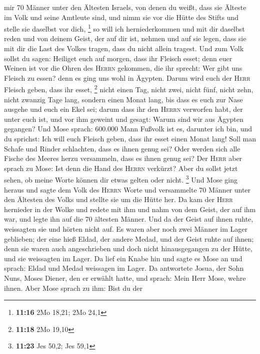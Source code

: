 mir 70 Männer unter den Ältesten Israels, von denen du weißt, dass sie
Älteste im Volk und seine Amtleute sind, und nimm sie vor die Hütte des
Stifts und stelle sie daselbst vor dich, \footnote{\textbf{11:16} 2Mo
  18,21; 2Mo 24,1}  so will ich herniederkommen und mit
dir daselbst reden und von deinem Geist, der auf dir ist, nehmen und auf
sie legen, dass sie mit dir die Last des Volkes tragen, dass du nicht
allein tragest.  Und zum Volk sollst du sagen: Heiliget
euch auf morgen, dass ihr Fleisch esset; denn euer Weinen ist vor die
Ohren des \textsc{Herrn} gekommen, die ihr sprecht: Wer gibt uns Fleisch
zu essen? denn es ging uns wohl in Ägypten. Darum wird euch der
\textsc{Herr} Fleisch geben, dass ihr esset, \footnote{\textbf{11:18}
  2Mo 19,10}  nicht einen Tag, nicht zwei, nicht fünf,
nicht zehn, nicht zwanzig Tage lang,  sondern einen Monat
lang, bis dass es euch zur Nase ausgehe und euch ein Ekel sei; darum
dass ihr den \textsc{Herrn} verworfen habt, der unter euch ist, und vor
ihm geweint und gesagt: Warum sind wir aus Ägypten gegangen?
 Und Mose sprach: 600.000 Mann Fußvolk ist es, darunter
ich bin, und du sprichst: Ich will euch Fleisch geben, dass ihr esset
einen Monat lang!  Soll man Schafe und Rinder schlachten,
dass es ihnen genug sei? Oder werden sich alle Fische des Meeres herzu
versammeln, dass es ihnen genug sei?  Der \textsc{Herr}
aber sprach zu Mose: Ist denn die Hand des \textsc{Herrn} verkürzt? Aber
du sollst jetzt sehen, ob meine Worte können dir etwas gelten oder
nicht. \footnote{\textbf{11:23} Jes 50,2; Jes 59,1}  Und
Mose ging heraus und sagte dem Volk des \textsc{Herrn} Worte und
versammelte 70 Männer unter den Ältesten des Volks und stellte sie um
die Hütte her.  Da kam der \textsc{Herr} hernieder in der
Wolke und redete mit ihm und nahm von dem Geist, der auf ihm war, und
legte ihn auf die 70 ältesten Männer. Und da der Geist auf ihnen ruhte,
weissagten sie und hörten nicht auf.  Es waren aber noch
zwei Männer im Lager geblieben; der eine hieß Eldad, der andere Medad,
und der Geist ruhte auf ihnen; denn sie waren auch angeschrieben und
doch nicht hinausgegangen zu der Hütte, und sie weissagten im Lager.
 Da lief ein Knabe hin und sagte es Mose an und sprach:
Eldad und Medad weissagen im Lager.  Da antwortete Josua,
der Sohn Nuns, Moses Diener, den er erwählt hatte, und sprach: Mein Herr
Mose, wehre ihnen.  Aber Mose sprach zu ihm: Bist du der
